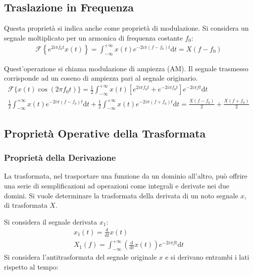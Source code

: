 \documentclass{article}
\newcommand{\df}{\mathrm{d}}
\numberwithin{equation}{subsection}
\begin{document}
\subsection{Traslazione in Frequenza}

Questa proprietà si indica anche come proprietà di modulazione. 
Si considera un segnale moltiplicato per un armonica di frequenza costante $f_0$:
\begin{gather*}
    \mathscr{F}\left\{e^{2i\pi f_0t}x(t)\right\}=\displaystyle\int_{-\infty}^{+\infty}x(t)e^{-2i\pi(f-f_0)t}\df t=X(f-f_0)
\end{gather*}

Quest'operazione si chiama modulazione di ampiezza (AM). Il segnale trasmesso corrisponde ad un coseno di ampiezza pari al segnale originario.
\begin{gather*}
    \mathscr{F}\{x(t)\cos(2\pi f_0t)\}=\displaystyle\frac{1}{2}\int_{-\infty}^{+\infty}x(t)\left[e^{2i\pi f_0t}+e^{-2i\pi f_0t}\right]e^{-2i\pi ft}\df t\\
    \frac{1}{2}\displaystyle\int_{-\infty}^{+\infty}x(t)e^{-2i\pi(f-f_0)t}\df t+\frac{1}{2}\int_{-\infty}^{+\infty}x(t)e^{-2i\pi (f+f_0)t}\df t=\frac{X(f-f_0)}{2}+\frac{X(f+f_0)}{2}
\end{gather*}

\subsection{Proprietà Operative della Trasformata}

\subsubsection{Proprietà della Derivazione}

La trasformata, nel trasportare una funzione da un dominio all'altro, può offrire una serie di semplificazioni ad operazioni come integrali e derivate nei due domini. Si vuole 
determinare la trasformata della derivata di un noto segnale $x$, di trasformata $X$. 

Si considera il segnale derivata $x_1$:
\begin{gather*}
    x_1(t)=\displaystyle\frac{\df}{\df t}x(t)\\
    X_1(f)=\displaystyle\int_{-\infty}^{+\infty}\left(\frac{\df}{\df t}x(t)\right)e^{-2i\pi ft}\df t
\end{gather*}
Si considera l'antitrasformata del segnale originale $x$ e si derivano entrambi i lati rispetto al tempo: 
\end{document}
